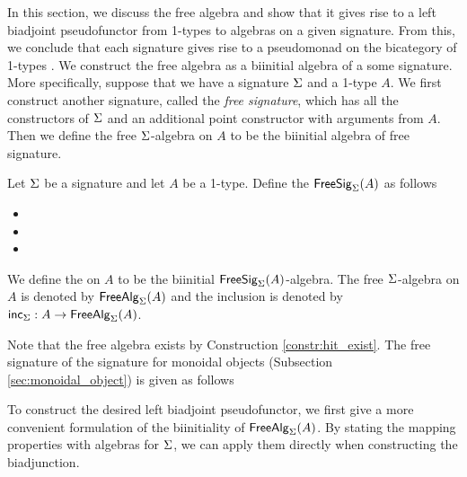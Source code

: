 In this section, we discuss the free algebra and show that it gives rise to a left biadjoint pseudofunctor from 1-types to algebras on a given signature.
From this, we conclude that each signature gives rise to a pseudomonad on the bicategory of 1-types \cite{lack2000coherent}.
We construct the free algebra as a biinitial algebra of a some signature.
More specifically, suppose that we have a signature $\Sigma$ and a 1-type $A$.
We first construct another signature, called the \emph{free signature}, which has all the constructors of $\Sigma$ and an additional point constructor with arguments from $A$.
Then we define the free $\Sigma$-algebra on $A$ to be the biinitial algebra of free signature.

\begin{definition}
Let $\Sigma$ be a signature and let $A$ be a 1-type.
Define the  $\mathsf{FreeSig}_{\Sigma}(A)$ as follows
\begin{itemize}
	\item 
	\item
	\item
\end{itemize}
We define the  on $A$ to be the biinitial $\mathsf{FreeSig}_{\Sigma}(A)$-algebra.
The free $\Sigma$-algebra on $A$ is denoted by $\mathsf{FreeAlg}_{\Sigma}(A)$ and the inclusion is denoted by $\mathsf{inc}_{\Sigma} : A \rightarrow \mathsf{FreeAlg}_{\Sigma}(A)$.
\end{definition}

Note that the free algebra exists by Construction \ref{constr:hit_exist}.
The free signature of the signature for monoidal objects (Subsection \ref{sec:monoidal_object}) is given as follows



To construct the desired left biadjoint pseudofunctor, we first give a more convenient formulation of the biinitiality of $\mathsf{FreeAlg}_{\Sigma}(A)$.
By stating the mapping properties with algebras for $\Sigma$, we can apply them directly when constructing the biadjunction.

